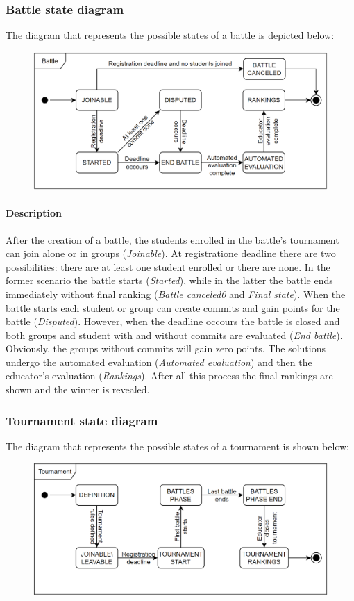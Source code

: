 \documentclass[12pt, a4paper]{report}
\begin{document}
    \subsubsection{Battle state diagram}
    The diagram that represents the possible states of a battle is depicted below: 
    \begin{figure}[H]
        \centering
        \includegraphics[width=0.75\linewidth]{images/battle.png}
    \end{figure}

    \paragraph*{Description}
    After the creation of a battle, the students enrolled in the battle's tournament can join alone or in groups (\textit{Joinable}). 
    At registratione deadline there are two possibilities: there are at least one student enrolled or there are none. 
    In the former scenario the battle starts (\textit{Started}), while in the latter the battle ends immediately without final ranking (\textit{Battle canceled0} and \textit{Final state}). 
    When the battle starts each student or group can create commits and gain points for the battle (\textit{Disputed}).
    However, when the deadline occours the battle is closed and both groups and student with and without commits are evaluated (\textit{End battle}). 
    Obviously, the groups without commits will gain zero points. 
    The solutions undergo the automated evaluation (\textit{Automated evaluation}) and then the educator's evaluation (\textit{Rankings}). 
    After all this process the final rankings are shown and the winner is revealed. 

    \subsubsection{Tournament state diagram}
    The diagram that represents the possible states of a tournament is shown below: 
    \begin{figure}[H]
        \centering
        \includegraphics[width=0.75\linewidth]{images/tournament.png}
    \end{figure}
\end{document}
